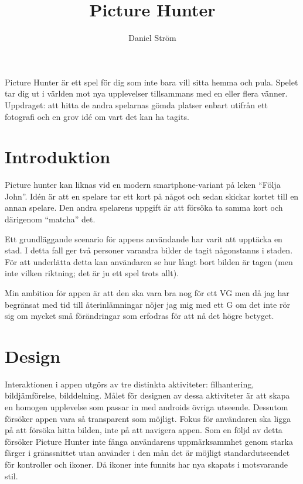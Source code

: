 \documentclass[11px, a4paper, twocolumn]{article}
\title{Picture Hunter}
\author{Daniel Ström \\ \mail{D@nielstrom.se}}
\begin{document}
\maketitle
	
\epigraph{%
	Picture Hunter är ett spel för dig som inte bara vill sitta hemma och pula. Spelet tar dig ut i världen mot nya upplevelser tillsammans med en eller flera vänner. Uppdraget: att hitta de andra spelarnas gömda platser enbart utifrån ett fotografi och en grov idé om vart det kan ha tagits.%
}{}

\tableofcontents

\listoffigures


\section{Introduktion}
	Picture hunter kan liknas vid en modern smartphone-variant på leken ``Följa John''. Idén är att en spelare tar ett kort på något och sedan skickar kortet till en annan spelare. Den andra spelarens uppgift är att försöka ta samma kort och därigenom ``matcha'' det.

	Ett grundläggande scenario för appens användande har varit att upptäcka en stad. I detta fall ger två personer varandra bilder de tagit någonstanns i staden. För att underlätta detta kan användaren se hur långt bort bilden är tagen (men inte vilken riktning; det är ju ett spel trots allt).

	Min ambition för appen är att den ska vara bra nog för ett VG men då jag har begränsat med tid till återinlämningar nöjer jag mig med ett G om det inte rör sig om mycket små förändringar som erfodras för att nå det högre betyget.


\section{Design}

	Interaktionen i appen utgörs av tre distinkta aktiviteter: filhantering, bildjämförelse,	bilddelning. Målet för designen av dessa aktiviteter är att skapa en homogen upplevelse som passar in med androids övriga utseende. Dessutom försöker appen vara så transparent som möjligt. Fokus för användaren ska ligga på att försöka hitta bilden, inte på att navigera appen. Som en följd av detta försöker Picture Hunter inte fånga användarens uppmärksammhet genom starka färger i gränssnittet utan använder i den mån det är möjligt standardutseendet för kontroller och ikoner. Då ikoner inte funnits har nya skapats i motsvarande stil.
\end{document}
